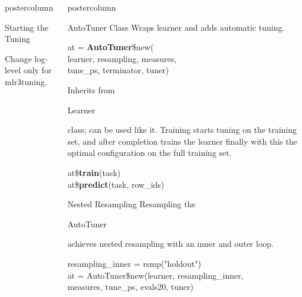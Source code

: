 \documentclass{beamer}
\newlength{\columnheight} %
\newcommand{\codeinline}[1]{\begin{codeboxinline}#1\end{codeboxinline}}
\begin{document}
\begin{frame}[fragile]{}
\begin{columns}
\begin{column}{.245\textwidth}
\begin{beamercolorbox}[center]{postercolumn}
\begin{minipage}{.98\textwidth}
{\begin{myblock}{Starting the Tuning}
\begin{codebox}
							\end{codebox}
							Change log-level only for mlr3tuning.
						\end{myblock}
						\vfill}
				\end{minipage}
			\end{beamercolorbox}
		\end{column}
		\begin{column}{.245\textwidth}
			\begin{beamercolorbox}[center]{postercolumn}
				\begin{minipage}{.98\textwidth}
					\parbox[t][\columnheight]{\textwidth}{
						\begin{myblock}{AutoTuner Class}
							Wraps learner and adds automatic tuning. 
							\\
							\begin{codeboxmultiline}[width=20cm]
								at = \textbf{AutoTuner}\$new(\\
								\hspace*{1ex}learner, resampling, measures, \\
								\hspace*{1ex}tune\_ps, terminator, tuner)
							\end{codeboxmultiline}
							\vspace{1em}
                            Inherits from \codeinline{Learner} class; can be used like it. 
                            Training starts tuning on the training set,
                            and after completion trains the learner finally with 
                            this the optimal configuration on the full training set.
							\begin{codeboxmultiline}[width=16.5cm]
								at\$\textbf{train}(task)\\
								at\$\textbf{predict}(task, row\_ids)
							\end{codeboxmultiline}
						\end{myblock}
						\begin{myblock}{Nested Resampling}
							Resampling the \codeinline{AutoTuner} achieves nested resampling 
							with an inner and outer loop. 
							\\
							\begin{codeboxexample}
								{\footnotesize
									resampling\_inner = rsmp("holdout")
									\vspace{1em}
									\\
									at = AutoTuner\$new(learner, resampling\_inner, \\
									\hspace*{1ex}measures, tune\_ps, evals20, tuner) \\
}
\end{codeboxexample}
\end{myblock}}
\end{minipage}
\end{beamercolorbox}
\end{column}
\end{columns}
\end{frame}
\end{document}
